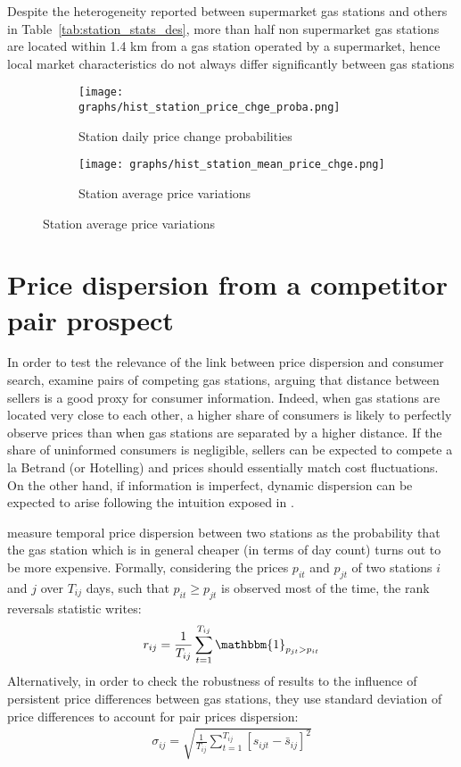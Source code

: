 \documentclass[english]{article}
\begin{document}
Despite the heterogeneity reported between supermarket gas stations and others in Table~\ref{tab:station_stats_des}, more than half non supermarket gas stations are located within 1.4 km from a gas station operated by a supermarket, hence local market characteristics do not always differ significantly between gas stations

\begin{figure}[H]
\centering
\caption{Histograms of station price changes}
\begin{subfigure}{.49\textwidth}
\centering
\texttt{[image: graphs/hist\_station\_price\_chge\_proba.png]}
\caption[short]{Station daily price change probabilities}
\label{fig:hist_station_price_chge_proba}
\end{subfigure}
\begin{subfigure}{.49\textwidth}
\centering
\texttt{[image: graphs/hist\_station\_mean\_price\_chge.png]}
\caption[short]{Station average price variations}
\label{fig:hist_station_mean_price_chge}
\end{subfigure}
\end{figure}


\section{Price dispersion from a competitor pair prospect}

In order to test the relevance of the link between price dispersion and consumer search, \cite{TAP11} examine pairs of competing gas stations, arguing that distance between sellers is a good proxy for consumer information. Indeed, when gas stations are located very close to each other, a higher share of consumers is likely to perfectly observe prices than when gas stations are separated by a higher distance. If the share of uninformed consumers is negligible, sellers can be expected to compete a la Betrand (or Hotelling) and prices should essentially match cost fluctuations. On the other hand, if information is imperfect, dynamic dispersion can be expected to arise following the intuition exposed in \cite{VAR80}.

\cite{TAP11} measure temporal price dispersion between two stations as the probability that the gas station which is in general cheaper (in terms of day count) turns out to be more expensive. Formally, considering the prices $p_{it}$ and $p_{jt}$ of two stations $i$ and $j$ over $T_{ij}$ days, such that $p_{it} \ge p_{jt}$ is observed most of the time, the rank reversals statistic writes:
\begin{align*}
r_{ij} = \frac{1}{T_{ij}} \sum_{t=1}^{T_{ij}} \mathbbm{1}_{p_{jt} > p_{it}}
\end{align*}
Alternatively, in order to check the robustness of results to the influence of persistent price differences between gas stations, they use standard deviation of price differences to account for pair prices dispersion:
\begin{align*}
\sigma_{ij} = \sqrt{\frac{1}{T_{ij}} \sum_{t=1}^{T_{ij}} [s_{ijt} - \bar{s}_{ij}]^2}
\end{align*}
\end{document}
